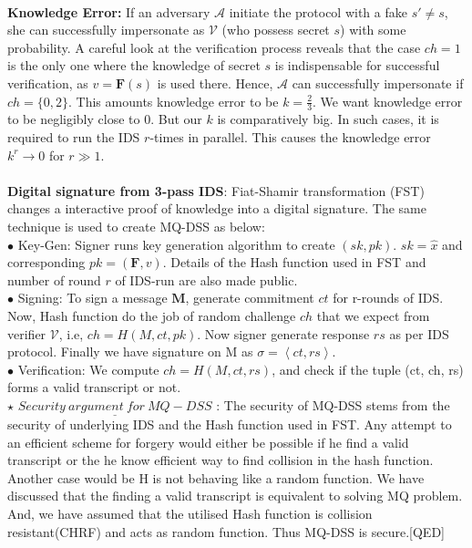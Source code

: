\documentclass{article}
\begin{document}
 \\
 \textbf{Knowledge Error:} If an adversary $\mathcal{A}$ initiate the protocol with a fake $s'\neq s$, she can successfully 
impersonate as $\mathcal{V}$ (who possess secret $s$) with some probability. A careful look at the verification process reveals that the case $ch=1$ is the only one where the knowledge of secret $s$ is indispensable for successful verification, as $v = \textbf{F}(s)$ is used there. Hence, $\mathcal{A}$ can successfully impersonate if $ch =\{0, 2\}$. This amounts knowledge error to be $k = \frac{2}{3}$. We want knowledge error to be negligibly close to 0. But our $k$ is comparatively big. In such cases, it is required to run the IDS $r$-times in parallel. This causes the knowledge error $k^r \rightarrow 0$ for $r\gg 1$.\\
\\
\textbf{Digital signature from 3-pass IDS}: Fiat-Shamir transformation (FST) changes a interactive proof of knowledge into a digital signature. The same technique is used to create MQ-DSS as below:\\
$\bullet$ Key-Gen: Signer runs key generation algorithm to create $(sk, pk)$. $sk=\hat{x}$ and corresponding $pk = (\mathbf{F},v)$. Details of the Hash function used in FST and number of round $r$ of IDS-run are also made public.\\
$\bullet$ Signing: To sign a message $\textbf{M}$, generate commitment $ct$ for r-rounds of IDS. Now, Hash function do the job of random challenge $ch$ that we expect from verifier $\mathcal{V}$, i.e, $ch = H(M, ct, pk)$. Now signer generate response $rs$ as per IDS protocol. Finally we have signature on M as $\sigma= \left\langle ct,rs\right\rangle$.\\
$\bullet$ Verification: We compute $ch=H(M,ct,rs)$, and check if the tuple (ct, ch, rs) forms a valid transcript or not.\\
$\star$ $\underline{Security\ argument\ for\ MQ-DSS}$ : The security of MQ-DSS stems from the security of underlying IDS and the Hash function used in FST.
Any attempt to an efficient scheme for forgery would either be possible if he find a valid transcript or the he know efficient way to find collision in the hash function. Another case would be H is not behaving like a random function. We have discussed that the finding a valid transcript is equivalent to solving MQ problem. And, we have assumed that the utilised Hash function is collision resistant(CHRF) and acts as random function. Thus MQ-DSS is secure.[QED]
\end{document}

